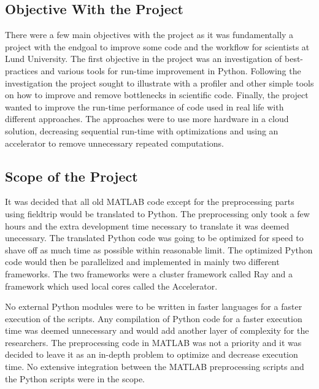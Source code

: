 \documentclass[12pt, a4paper]{article}
\begin{document}
\subsection{Objective With the Project}%

There were a few main objectives with the project as it was fundamentally a project with the endgoal to improve some code and the workflow for scientists at Lund University.
The first objective in the project was an investigation of best-practices and various tools for run-time improvement in Python.
Following the investigation the project sought to illustrate with a profiler and other simple tools on how to improve and remove bottlenecks in scientific code.
Finally, the project wanted to improve the run-time performance of code used in real life with different approaches.
The approaches were to use more hardware in a cloud solution, decreasing sequential run-time with optimizations and using an accelerator to remove unnecessary repeated computations.

\subsection{Scope of the Project}%

It was decided that all old MATLAB code except for the preprocessing parts using fieldtrip would be translated to Python.
The preprocessing only took a few hours and the extra development time necessary to translate it was deemed unecessary. 
The translated Python code was going to be optimized for speed to shave off as much time as possible within reasonable limit.
The optimized Python code would then be parallelized and implemented in mainly two different frameworks.
The two frameworks were a cluster framework called Ray and a framework which used local cores called the Accelerator.

No external Python modules were to be written in faster languages for a faster execution of the scripts.
Any compilation of Python code for a faster execution time was deemed unnecessary and would add another layer of complexity for the researchers.
The preprocessing code in MATLAB was not a priority and it was decided to leave it as an in-depth problem to optimize and decrease execution time.
No extensive integration between the MATLAB preprocessing scripts and the Python scripts were in the scope.

\end{document}
